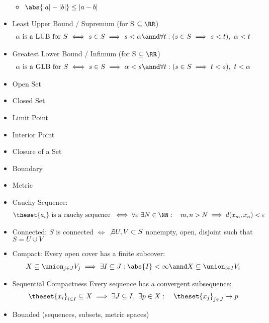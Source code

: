 \begin{itemize}
  \begin{itemize}
  \tightlist
  \item
    \({\abs{| a | - | b |} \leq | a - b | }\)
  \end{itemize}
\item
  Least Upper Bound / Supremum (for S \(\subseteq \RR\))
  \begin{align*}
    \alpha\text{ is a LUB for } S \iff s \in S \implies s < \alpha \annd \forall t : (s \in S \implies s < t),~ \alpha < t
    \end{align*}
\item
  Greatest Lower Bound / Infimum (for S \(\subseteq \RR\))
  \begin{align*}
    \alpha\text{ is a GLB for } S \iff s \in S \implies \alpha < s \annd \forall t : (s \in S \implies t < s),~ t < \alpha
    \end{align*}
\item
  Open Set
\item
  Closed Set
\item
  Limit Point
\item
  Interior Point
\item
  Closure of a Set
\item
  Boundary
\item
  Metric
\item
  Cauchy Sequence:
  \begin{align*}\theset{a_i} \text{ is a cauchy sequence } \iff \forall \varepsilon~\exists N\in\NN: \quad m,n > N \implies d(x_m, x_n) < \varepsilon \end{align*}
\item
  Connected: \(S\) is connected \(\iff\) \(\not\exists U,V\subset S\)
  nonempty, open, disjoint such that \(S = U \cup V\)
\item
  Compact: Every open cover has a finite subcover:
  \begin{align*}
  X \subseteq \union_{j\in J} V_j \implies \exists I \subseteq J: \abs{I} < \infty \annd X\subseteq \union_{i\in I} V_i
  \end{align*}
\item
  Sequential Compactness Every sequence has a convergent subsequence:
  \begin{align*}
  \theset{x_i}_{i\in I}\subseteq X \implies \exists J\subseteq I,~ \exists p\in X: \quad \theset{x_j}_{j\in J} \to p
  \end{align*}
\item
  Bounded (sequences, subsets, metric spaces)
  \begin{align*}

\end{align*}
\end{itemize}
